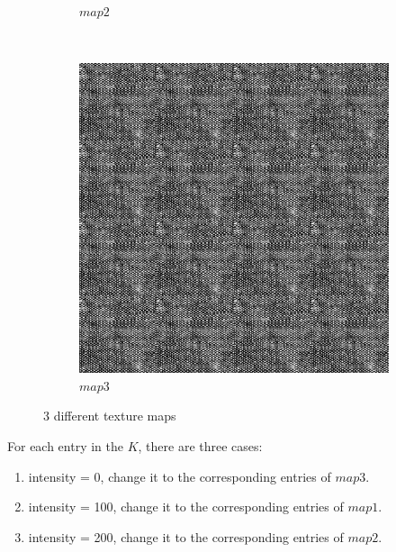 \documentclass{article}
\begin{document}
\begin{enumerate}[label=(\alph*)]
\begin{figure}[!htb]
\begin{subfigure}[b]{0.3\textwidth}
                \caption{$map2$}
            \end{subfigure}
            ~
            \begin{subfigure}[b]{0.3\textwidth}
                \includegraphics[width=\textwidth]{img/map3.png}
                \caption{$map3$}
            \end{subfigure}
        
            \caption{3 different texture maps}
        \end{figure} 

        For each entry in the $K$, there are three cases:

        \begin{enumerate}[label=(\roman*)]
            \item intensity = 0, change it to the corresponding entries of $map3$.
            \item intensity = 100, change it to the corresponding entries of $map1$.
            \item intensity = 200, change it to the corresponding entries of $map2$.
        \end{enumerate}


\end{enumerate}
\end{document}

